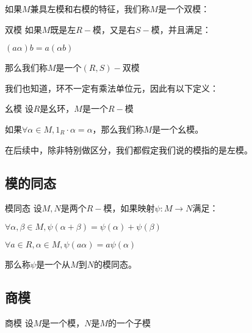\documentclass[12pt, a4paper, oneside, UTF8]{ctexbook}
\begin{document}
			如果$M$兼具左模和右模的特征，我们称$M$是一个双模：
			\begin{defn}{双模}{}
				如果$M$既是左$R-$模，又是右$S-$模，并且满足：

				$(a \alpha )b=a(\alpha b)$

				那么我们称$M$是一个$(R,S)-$双模
			\end{defn}
			我们也知道，环不一定有乘法单位元，因此有以下定义：
			\begin{defn}{幺模}{}
				设$R$是幺环，$M$是一个$R-$模

				如果$\forall \alpha \in M,1_R \cdot \alpha =\alpha $，那么我们称$M$是一个幺模。
			\end{defn}
			在后续中，除非特别做区分，我们都假定我们说的模指的是左模。
		\subsection{模的同态}
			\begin{defn}{模同态}{}
				设$M,N$是两个$R-$模，如果映射$\psi  : M \rightarrow N$满足：

				$\forall \alpha ,\beta  \in M,\psi (\alpha +\beta )=\psi (\alpha )+\psi (\beta )$

				$\forall a \in R,\alpha  \in M,\psi (a\alpha )=a\psi (\alpha )$

				那么称$\psi $是一个从$M$到$N$的模同态。
			\end{defn}
		\subsection{商模}
			\begin{defn}{商模}{}
				设$M$是一个模，$N$是$M$的一个子模
			\end{defn}
\ifx\allfiles\undefined
\end{document}
